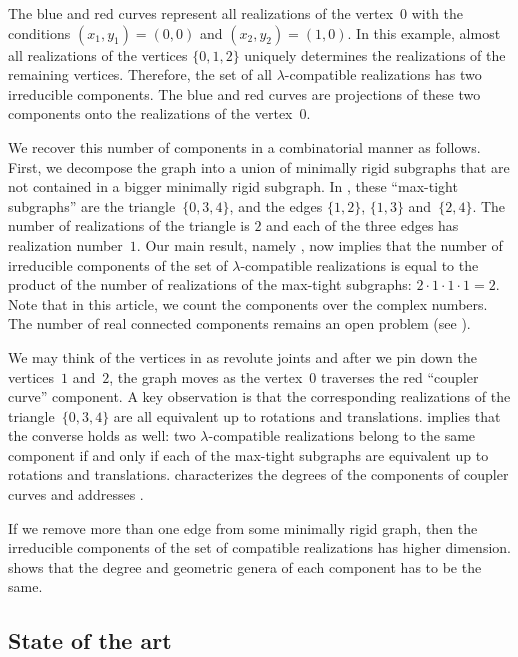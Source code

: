 \documentclass[12pt]{article}
\theoremstyle{definition}
\begin{document}
The blue and red curves represent all realizations of the vertex~$0$
with the conditions $(x_1,y_1)=(0,0)$ and $(x_2,y_2)=(1,0)$.
In this example, almost all realizations of the vertices $\{0,1,2\}$
uniquely determines the realizations of the remaining vertices.
Therefore, the set of all $\lambda$-compatible realizations has two irreducible components.
The blue and red curves are projections of these two components onto the realizations of the vertex~$0$.

We recover this number of components in a combinatorial manner as follows.
First, we decompose the graph into a union of minimally rigid subgraphs that are not contained in
a bigger minimally rigid subgraph. In , these ``max-tight subgraphs''
are the triangle~$\{0,3,4\}$, and the edges $\{1,2\}$, $\{1,3\}$ and~$\{2,4\}$.
The number of realizations of the triangle is $2$
and each of the three edges has realization number~$1$.
Our main result, namely , now implies that the number
of irreducible components of the set of $\lambda$-compatible realizations
is equal to the product of the number of realizations of the
max-tight subgraphs: $2\cdot 1\cdot 1\cdot 1=2$.
Note that in this article, we count the components over the complex numbers.
The number of real connected components remains an open problem (see ).

We may think of the vertices in  as revolute joints and after we pin down the vertices~$1$ and~$2$,
the graph moves as the vertex~$0$ traverses the red ``coupler curve'' component.
A key observation is that
the corresponding realizations of the triangle~$\{0,3,4\}$
are all equivalent up to rotations and translations.
 implies that the converse holds as well:
two $\lambda$-compatible realizations
belong to the same component if and only if each of the max-tight subgraphs
are equivalent up to rotations and translations.
 characterizes the degrees
of the components of coupler curves and addresses \citep[Conjecture~2 and Open problem~3]{2023-cal}.

If we remove more than one edge from some minimally rigid graph,
then the irreducible components
of the set of compatible realizations has higher dimension.
 shows that
the degree and geometric genera of each component has to be the same.

\subsection*{State of the art}
\end{document}
